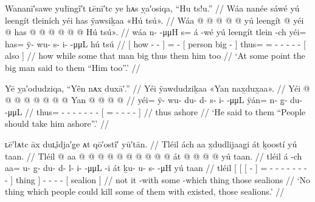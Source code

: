 \ex\label{ex:93-54-big-man-said}%
%
\begingl
	\glpreamble	Wananī′sawe yułīngî′t ʟēnī′tc ye hᴀs ỵa′osiqa, “Hu ts!u.” //
	\glpreamble	Wáa nanée sáwé yú leengít tleiních yéi has ÿawsiḵaa «\!Hú tsú\!». //
	\gla	{} Wáa  @ {} @ {} @ {} {}
		 @ {} @ {}
		{} yú leengít  @ {} {}
		yéi @ has @  @ {} @ {} @ {} @ {} @ {}
		{} Hú tsú\!». {} //
	\glb	{} wáa n-  -μμH {} {} 
		s= á -wé
		{} yú leengít tlein -ch {}
		yéi= has= ÿ- wu- s- i-  -μμL
		{} hú tsú {} //
	\glc	{}[ how -  - \· {}]
		=  -
		{}[  person big - {}]
		thus= = - - - -  -
		{}[  also {}] //
	\gld	{} how  {} {} \·while {}
		some\·  {}
		{} that man big {} {}
		thus them  {} {} {} {} {} 
		{} him too {} //
	\glft	‘At some point the big man said to them “Him too”.’
		//
\endgl
\xe

\ex\label{ex:93-55-take-him-ashore}%
%
\begingl
	\glpreamble	Yē ỵa′odudziqa, “Yên nᴀx duxā′.” //
	\glpreamble	Yéi ÿawdudziḵaa «\!Yan nax̱dux̱aa\!». //
	\gla	Yéi @  @ {} @ {} @ {} @ {} @ {} @ {} @ {}
		{} Yan  @ {} @ {} @ {} @ {} {} //
	\glb	yéi= ÿ- wu- du- d- s- i-  -μμL
		{} ÿán= n- g̱- du-  -μμL {} //
	\glc	thus= - - - - - -  -
		{}[ = - - -  - {}] //
	\gld	thus  {} {} {} {} {} {} {}
		{} ashore  {} {} {} {} {} //
	\glft	‘He said to them “People should take him ashore”.’
		//
\endgl
\xe


\ex\label{ex:93-56-no-thing-with}%
%
\begingl
	\glpreamble	ʟē′łᴀtc āx duʟ̣îdja′g̣e ᴀt qō′ostî′ yū′tān. //
	\glpreamble	Tléil ách aa x̱dudlijaag̱i át ḵoostí yú taan. //
	\gla	Tléil
		{} {} {}  @ {} {}
				aa @  @ {} @ {} @ {} @ {} @ {} @ {} @ {} @ {} @ {} {}
			át {}
		 @ {} @ {} @ {} @ {}
		{} yú taan. {} //
	\glb	tléil
		{} {} {} á -ch {}
				aa= u- {} g̱- du- d- l- i-  -μμL -i {}
			át {}
		ḵu- u- s-  -μH
		{} yú taan {} //
	\glc	tléil
		{}[ {}[ {}[  - {}]
				= - \· - - - - -
					 - - {}]
			thing {}]
		- - -  -
		{}[  sealion {}] //
	\gld	not
		{} {} {} it -with {}
				some  {} {} {} {} {} {} {} {} -which {}
			thing {}
		 {} {} {} {}
		{} those sealions {} //
	\glft	‘No thing which people could kill some of them with existed, those sealions.’
		//
\endgl
\xe

